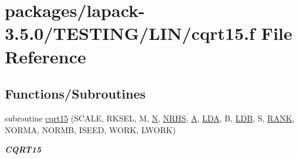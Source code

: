 \hypertarget{cqrt15_8f}{}\section{packages/lapack-\/3.5.0/\+T\+E\+S\+T\+I\+N\+G/\+L\+I\+N/cqrt15.f File Reference}
\label{cqrt15_8f}
\subsection*{Functions/\+Subroutines}
\begin{DoxyCompactItemize}
\item 
subroutine \hyperlink{group__complex__lin_gaf0759d81c8e18be6516d171e12c1171d}{cqrt15} (S\+C\+A\+L\+E, R\+K\+S\+E\+L, M, \hyperlink{polmisc_8c_a0240ac851181b84ac374872dc5434ee4}{N}, \hyperlink{example__user_8c_aa0138da002ce2a90360df2f521eb3198}{N\+R\+H\+S}, \hyperlink{classA}{A}, \hyperlink{example__user_8c_ae946da542ce0db94dced19b2ecefd1aa}{L\+D\+A}, B, \hyperlink{example__user_8c_a50e90a7104df172b5a89a06c47fcca04}{L\+D\+B}, S, \hyperlink{splinemodule_8c_a3a88bcc63386de30443dacede2e01847}{R\+A\+N\+K}, N\+O\+R\+M\+A, N\+O\+R\+M\+B, I\+S\+E\+E\+D, W\+O\+R\+K, L\+W\+O\+R\+K)
\begin{DoxyCompactList}\small\item\em {\bfseries C\+Q\+R\+T15} \end{DoxyCompactList}\end{DoxyCompactItemize}
